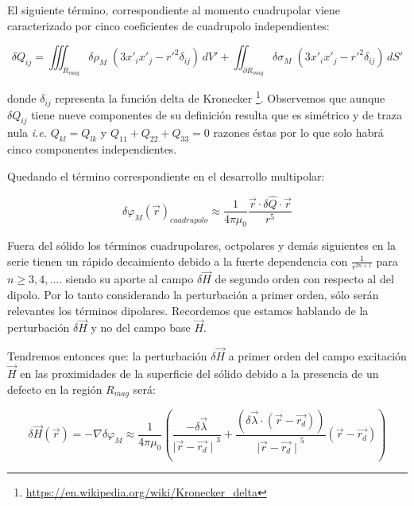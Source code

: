 El siguiente término, correspondiente al momento cuadrupolar viene caracterizado por cinco coeficientes de cuadrupolo independientes:

\begin{equation}
	\label{eq:Cuadrupolo}
	\delta Q_{ij} = \iiint_{R_{mag}} \delta\rho_{M}\;  \left( 3 x'_{i}x'_{j}-r'^2 \delta_{ij} \right) \,dV' + 
	\iint_{\partial R_{mag}} \delta\sigma_{M}\;  \left( 3 x'_{i}x'_{j}-r'^2 \delta_{ij} \right) \,dS'
\end{equation}

donde $\delta_{ij}$ representa la función delta de Kronecker \footnote{\url{https://en.wikipedia.org/wiki/Kronecker\_delta}}. Observemos que aunque $\delta Q_{ij}$ tiene nueve componentes de su definición resulta que es simétrico y de traza nula \textit{i.e.} $Q_{kl}=Q_{lk}$ y $Q_{11}+Q_{22}+Q_{33}=0 $ razones éstas por lo que solo habrá cinco componentes independientes.

Quedando el término correspondiente en el desarrollo multipolar: 

\begin{equation}
	\label{eq:GaussGreenCuadrupolo}
	\delta\varphi_{M}(\vec{r})_{cuadrupolo} \approx 
	\frac{1}{4\pi\mu_{0}} 
	\frac{\vec{r} \cdot \delta\hat{Q} \cdot \vec{r}}{r^5}
\end{equation}

Fuera del sólido los términos cuadrupolares, octpolares y demás siguientes en la serie tienen  un rápido decaimiento debido a la fuerte dependencia con $\frac{1}{r^{2n+1}}$ para $n \geq 3, 4, ... $. siendo su aporte al campo $\delta\vec{H}$ de segundo orden con respecto al del dipolo. Por lo tanto considerando la perturbación a primer orden, sólo serán relevantes los términos dipolares. Recordemos que estamos hablando de la perturbación $\delta\vec{H}$ y no del campo base $\vec{H}$.     

Tendremos entonces que: la perturbación $\delta\vec{H}$ a primer orden del campo excitación $\vec{H}$ en las proximidades de la superficie del sólido debido a la presencia de un defecto en la región $R_{mag}$ será:

\begin{equation}
	\label{eq:GaussGreenFinal}
	\delta\vec{H}(\vec{r}) = -\nabla\delta\varphi_{M} \approx \frac{1}{4\pi\mu_{0}}\left(  
	\frac{-\delta\vec{\lambda}}{{\mid\vec{r}-\vec{r_{d}}\mid}^3} + 
	\frac{	\left( \delta\vec{\lambda} \cdot \left( \vec{r}-\vec{r_{d}} \right) \right) }{ {\mid\vec{r}-\vec{r_{d}}\mid}^5} 
	\left( \vec{r}-\vec{r_{d}} \right) \right) 
\end{equation}


